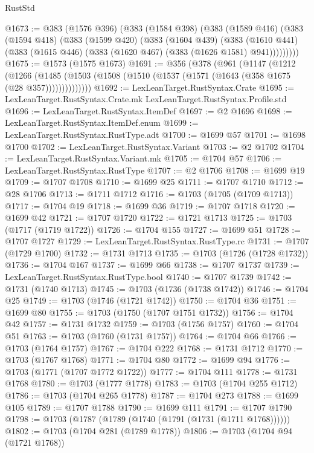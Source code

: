 \begin{lexlean}{RustStd}
\begin{coremodule}
@1673 := @383
    (@1576 @396)
    (@383
      (@1584 @398)
      (@383
        (@1589 @416)
        (@383
          (@1594 @418)
          (@383
            (@1599 @420)
            (@383
              (@1604 @439)
              (@383
                (@1610 @441)
                (@383 (@1615 @446) (@383 (@1620 @467) (@383 (@1626 @1581) @941)))))))))
@1675 := @1573 (@1575 @1673)
@1691 := @356
    (@378
      (@961
        (@1147
          (@1212
            (@1266
              (@1485 (@1503 (@1508 (@1510 (@1537 (@1571 (@1643 (@358 @1675 (@28 @357))))))))))))))
@1692 := LexLeanTarget.RustSyntax.Crate
@1695 := LexLeanTarget.RustSyntax.Crate.mk LexLeanTarget.RustSyntax.Profile.std
@1696 := LexLeanTarget.RustSyntax.ItemDef
@1697 := @2 @1696
@1698 := LexLeanTarget.RustSyntax.ItemDef.enum
@1699 := LexLeanTarget.RustSyntax.RustType.adt
@1700 := @1699 @57
@1701 := @1698 @1700
@1702 := LexLeanTarget.RustSyntax.Variant
@1703 := @2 @1702
@1704 := LexLeanTarget.RustSyntax.Variant.mk
@1705 := @1704 @57
@1706 := LexLeanTarget.RustSyntax.RustType
@1707 := @2 @1706
@1708 := @1699 @19
@1709 := @1707 @1708
@1710 := @1699 @25
@1711 := @1707 @1710
@1712 := @28 @1706
@1713 := @1711 @1712
@1716 := @1703 (@1705 (@1709 @1713))
@1717 := @1704 @19
@1718 := @1699 @36
@1719 := @1707 @1718
@1720 := @1699 @42
@1721 := @1707 @1720
@1722 := @1721 @1713
@1725 := @1703 (@1717 (@1719 @1722))
@1726 := @1704 @155
@1727 := @1699 @51
@1728 := @1707 @1727
@1729 := LexLeanTarget.RustSyntax.RustType.rc
@1731 := @1707 (@1729 @1700)
@1732 := @1731 @1713
@1735 := @1703 (@1726 (@1728 @1732))
@1736 := @1704 @167
@1737 := @1699 @66
@1738 := @1707 @1737
@1739 := LexLeanTarget.RustSyntax.RustType.bool
@1740 := @1707 @1739
@1742 := @1731 (@1740 @1713)
@1745 := @1703 (@1736 (@1738 @1742))
@1746 := @1704 @25
@1749 := @1703 (@1746 (@1721 @1742))
@1750 := @1704 @36
@1751 := @1699 @80
@1755 := @1703 (@1750 (@1707 @1751 @1732))
@1756 := @1704 @42
@1757 := @1731 @1732
@1759 := @1703 (@1756 @1757)
@1760 := @1704 @51
@1763 := @1703 (@1760 (@1731 @1757))
@1764 := @1704 @66
@1766 := @1703 (@1764 @1757)
@1767 := @1704 @222
@1768 := @1731 @1712
@1770 := @1703 (@1767 @1768)
@1771 := @1704 @80
@1772 := @1699 @94
@1776 := @1703 (@1771 (@1707 @1772 @1722))
@1777 := @1704 @111
@1778 := @1731 @1768
@1780 := @1703 (@1777 @1778)
@1783 := @1703 (@1704 @255 @1712)
@1786 := @1703 (@1704 @265 @1778)
@1787 := @1704 @273
@1788 := @1699 @105
@1789 := @1707 @1788
@1790 := @1699 @111
@1791 := @1707 @1790
@1798 := @1703 (@1787 (@1789 (@1740 (@1791 (@1731 (@1711 @1768))))))
@1802 := @1703 (@1704 @281 (@1789 @1778))
@1806 := @1703 (@1704 @94 (@1721 @1768))

\end{coremodule}
\end{lexlean}
